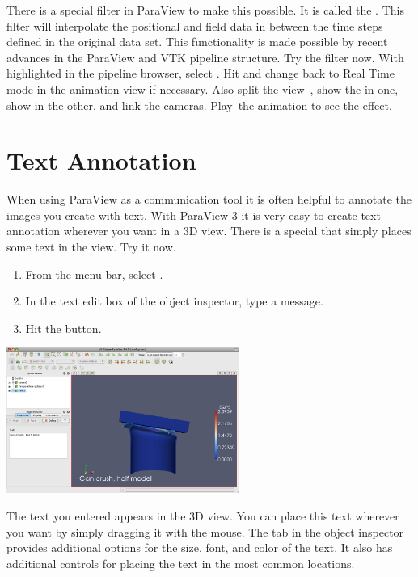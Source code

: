 There is a special filter in ParaView to make this possible.  It is called
the .  This filter will interpolate the
positional and field data in between the time steps defined in the original
data set.  This functionality is made possible by recent advances in the
ParaView and VTK pipeline structure.  Try the filter now.  With
 highlighted in the pipeline browser, select  \ra
{} \ra {}.  Hit \apply and change back
to Real Time mode in the animation view if necessary.  Also split the
view~\splitViewH, show the  in one, show
 in the other, and link the cameras.  Play~\vcrPlay the
animation to see the effect.


\section{Text Annotation}

When using ParaView as a communication tool it is often helpful to annotate
the images you create with text.  With ParaView 3 it is very easy to create
text annotation wherever you want in a 3D view.  There is a special
 that simply places some text in the view.  Try it
now.

\begin{enumerate}
\item From the menu bar, select  \ra {}.
\item In the text edit box of the object inspector, type a message.
\item Hit the \apply button.
\end{enumerate}

\begin{inlinefig}
  \includegraphics[width=3in]{images/TextSource}
\end{inlinefig}

The text you entered appears in the 3D view.  You can place this text
wherever you want by simply dragging it with the mouse.  The 
tab in the object inspector provides additional options for the size, font,
and color of the text.  It also has additional controls for placing the
text in the most common locations.

